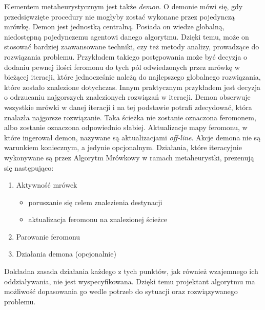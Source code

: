 \documentclass[printmode, openany, oneside, eng]{mgr}
\begin{document}
Elementem metaheurystycznym jest także \textit{demon}. O demonie mówi się, gdy przedsięwzięte procedury nie mogłyby zostać wykonane przez pojedynczą mrówkę. Demon jest jednostką centralną. Posiada on wiedze globalną, niedostępną pojedynczemu agentowi danego algorytmu. Dzięki temu, może on stosować bardziej zaawansowane techniki, czy też metody analizy, prowadzące do rozwiązania problemu. Przykładem takiego postępowania może być decyzja o dodaniu pewnej ilości feromonu do tych pól odwiedzonych przez mrówkę w bieżącej iteracji, które jednocześnie należą do najlepszego globalnego rozwiązania, które zostało znalezione dotychczas. Innym praktycznym przykładem jest decyzja o odrzucaniu najgorszych znalezionych rozwiązań w  iteracji. Demon obserwuje wszystkie mrówki w danej iteracji i na tej podstawie potrafi zdecydować, która znalazła najgorsze rozwiązanie. Taka ścieżka nie zostanie oznaczona feromonem, albo zostanie oznaczona odpowiednio słabiej. Aktualizacje mapy feromonu, w które ingerował demon, nazywane są aktualizacjami  \textit{off-line}. Akcje demona nie są warunkiem koniecznym, a jedynie opcjonalnym. 
\newline Działania, które iteracyjnie wykonywane są przez Algorytm Mrówkowy w ramach metaheurystki, prezenują się następująco:
\begin{enumerate}
\item Aktywność mrówek
\begin{itemize}
\item poruszanie się celem znalezienia destynacji
\item aktualizacja feromonu na znalezionej ścieżce
\end{itemize}
\item Parowanie feromonu
\item Działania demona (opcjonalnie)
\end{enumerate}
Dokładna zasada działania każdego z tych punktów, jak również wzajemnego ich oddziaływania, nie jest wyspecyfikowana. Dzięki temu projektant algorytmu ma możliwość dopasowania go wedle potrzeb do sytuacji oraz rozwiązywanego problemu.
\end{document}

